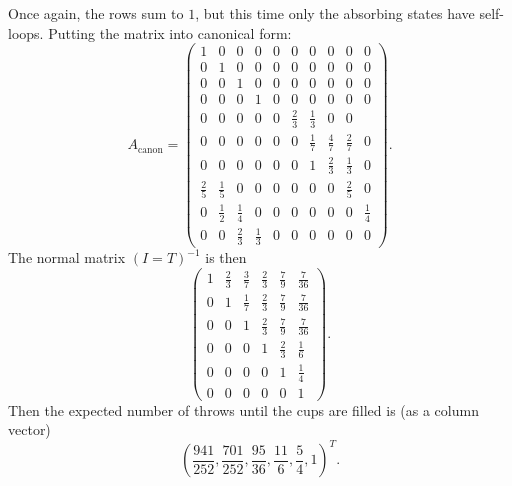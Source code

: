 \documentclass[12pt]{article}
\begin{document}
\begin{solution}
\begin{enumerate}[label=(\alph*)]
        Once again, the rows sum to \( 1 \), but this time only the
        absorbing states have self-loops.  Putting the matrix into
        canonical form:
        \[
            A_{\text{canon}} =
            \begin{pmatrix}
                1 & 0 & 0 & 0 & 0 & 0 & 0 & 0 & 0 & 0\\
                0 & 1 & 0 & 0 & 0 & 0 & 0 & 0 & 0 & 0\\
                0 & 0 & 1 & 0 & 0 & 0 & 0 & 0 & 0 & 0\\
                0 & 0 & 0 & 1 & 0 & 0 & 0 & 0 & 0 & 0\\
                0 & 0 & 0 & 0 & 0 & \frac{2}{3} & \frac{1}{3} & 0 & 0\\
                0 & 0 & 0 & 0 & 0 & 0 & \frac{1}{7} & \frac{4}{7} &
                \frac{2}{7} & 0\\
                0 & 0 & 0 & 0 & 0 & 0 & 1 & \frac{2}{3} & \frac{1}{3} &
                0\\
                \frac{2}{5} & \frac{1}{5} & 0 & 0 & 0 & 0 & 0 & 0 &
                \frac{2}{5} & 0\\
                0 & \frac{1}{2} & \frac{1}{4} & 0 & 0 & 0 & 0 & 0 & 0 &
                \frac{1}{4} \\
                0 & 0 & \frac{2}{3} & \frac{1}{3} & 0 & 0 & 0 & 0 & 0 &
                0
            \end{pmatrix}
            .
        \] The normal matrix \( (I = T)^{-1} \) is then
        \[
            \begin{pmatrix}
                1 & \frac{2}{3} & \frac{3}{7} & \frac{2}{3} & \frac{7}{9}
                & \frac{7}{36}\\
                0 & 1 & \frac{1}{7} & \frac{2}{3} & \frac{7}{9} & \frac{7}
                {36}\\
                0 & 0 & 1 & \frac{2}{3} & \frac{7}{9} & \frac{7}{36}\\
                0 & 0 & 0 & 1 & \frac{2}{3} & \frac{1}{6}\\
                0 & 0 & 0 & 0 & 1 & \frac{1}{4}\\
                0 & 0 & 0 & 0 & 0 & 1
            \end{pmatrix}
            .
        \] Then the expected number of throws until the cups are filled
        is (as a column vector)
        \[
            \left( \frac{941}{252}, \frac{701}{252}, \frac{95}{36},
            \frac{11}{6}, \frac{5}{4}, 1 \right)^{T}.
        \]


\end{enumerate}
\end{solution}
\end{document}
